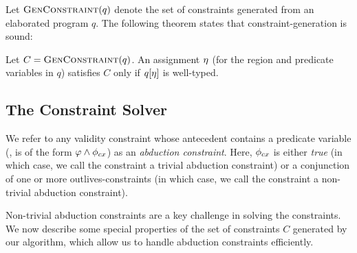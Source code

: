 %

Let $\textsc{GenConstraint}(q)$ denote the set of constraints generated from an elaborated program $q$.
The following theorem states that constraint-generation is sound:
\begin{theorem}
\label{thm:constraint-generation-sc}
Let $C = \textsc{GenConstraint}(q)$.
An assignment $\eta$ (for the region and predicate variables in $q$)
satisfies $C$ only if $q[\eta]$ is well-typed.
\end{theorem}

\subsection{The Constraint Solver}

We refer to any validity constraint whose antecedent contains a predicate variable
(\ie, is of the form $\varphi \wedge \phi_{cx}$) as an \emph{abduction constraint}.
Here,  $\phi_{cx}$ is either \emph{true} (in which case, we call the constraint a trivial
abduction constraint) or a conjunction of one or more outlives-constraints (in
which case, we call the constraint a non-trivial abduction constraint).

Non-trivial abduction constraints are a key challenge in solving the constraints.
We now describe some special properties of the set of constraints $C$
generated by our algorithm, which allow us to handle abduction constraints efficiently.

